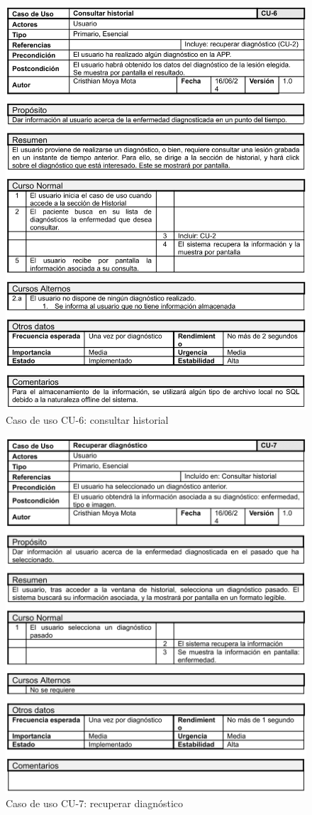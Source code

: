 \begin{figure}[H]
	\centering
	\includegraphics[scale=0.85]{imagenes/cu-6.png}
	\caption{Caso de uso CU-6: consultar historial}
	\label{fig:cu6}
\end{figure}

\begin{figure}[H]
	\centering
	\includegraphics[scale=0.85]{imagenes/cu-7.png}
	\caption{Caso de uso CU-7: recuperar diagnóstico}
	\label{fig:cu7}
\end{figure}


